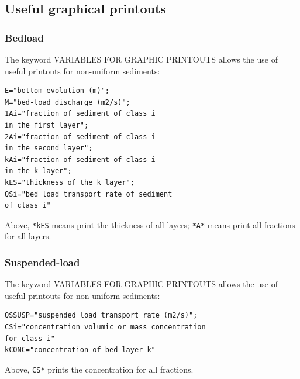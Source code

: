 \subsection{Useful graphical printouts}
\subsubsection{Bedload}
The keyword {\ttfamily VARIABLES FOR GRAPHIC PRINTOUTS} allows the use of useful printouts for non-uniform sediments:
\begin{lstlisting}[frame=trBL]   
E="bottom evolution (m)";
M="bed-load discharge (m2/s)";
1Ai="fraction of sediment of class i 
in the first layer";
2Ai="fraction of sediment of class i 
in the second layer";
kAi="fraction of sediment of class i 
in the k layer";
kES="thickness of the k layer";
QSi="bed load transport rate of sediment 
of class i"
\end{lstlisting}
Above, \texttt{*kES} means print the thickness of all layers; \texttt{*A*} means print all fractions for all layers.

\subsubsection{Suspended-load}
The keyword {\ttfamily VARIABLES FOR GRAPHIC PRINTOUTS} allows the use of useful printouts for non-uniform sediments:
\begin{lstlisting}[frame=trBL]   
QSSUSP="suspended load transport rate (m2/s)";
CSi="concentration volumic or mass concentration 
for class i"
kCONC="concentration of bed layer k"
\end{lstlisting}
Above, \texttt{CS*} prints the concentration for all fractions.


